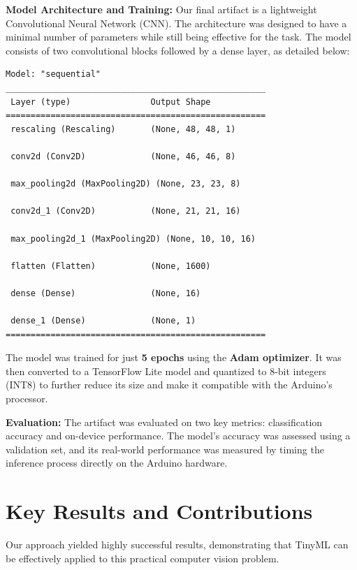 \documentclass[sigconf,10pt,nonacm]{acmart}
\begin{document}
\noindent\textbf{Model Architecture and Training:} Our final artifact is a lightweight Convolutional Neural Network (CNN). The architecture was designed to have a minimal number of parameters while still being effective for the task.
The model consists of two convolutional blocks followed by a dense layer, as detailed below:
\begin{verbatim}
Model: "sequential"
____________________________________________________
 Layer (type)                Output Shape          
====================================================
 rescaling (Rescaling)       (None, 48, 48, 1)     
                                                 
 conv2d (Conv2D)             (None, 46, 46, 8)     
                                                 
 max_pooling2d (MaxPooling2D) (None, 23, 23, 8)     
                                                 
 conv2d_1 (Conv2D)           (None, 21, 21, 16)    
                                                 
 max_pooling2d_1 (MaxPooling2D) (None, 10, 10, 16)    
                                                 
 flatten (Flatten)           (None, 1600)          
                                                 
 dense (Dense)               (None, 16)            
                                                 
 dense_1 (Dense)             (None, 1)             
====================================================
\end{verbatim}
The model was trained for just \textbf{5 epochs} using the \textbf{Adam optimizer}. It was then converted to a TensorFlow Lite model and quantized to 8-bit integers (INT8) to further reduce its size and make it compatible with the Arduino's processor.

\noindent\textbf{Evaluation:} The artifact was evaluated on two key metrics: classification accuracy and on-device performance. The model's accuracy was assessed using a validation set, and its real-world performance was measured by timing the inference process directly on the Arduino hardware.

\section{Key Results and Contributions}
\label{sec:key-contributions}
Our approach yielded highly successful results, demonstrating that TinyML can be effectively applied to this practical computer vision problem.
\end{document}
